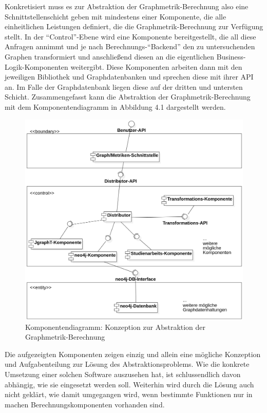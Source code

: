 \documentclass[a4paper,12pt,ngerman,chapterprefix=false,listof=totoc,bibliography=totoc]{scrreprt}
\begin{document}
{{{Konkretisiert muss es zur Abstraktion der Graphmetrik-Berechnung also eine Schnittstellenschicht geben mit mindestens einer Komponente, die alle einheitlichen Leistungen definiert, die die Graphmetrik-Berechnung zur Verfügung stellt. In der "`Control"'-Ebene wird eine Komponente bereitgestellt, die all diese Anfragen annimmt und je nach Berechnungs-"`Backend"' den zu untersuchenden Graphen transformiert und anschließend diesen an die eigentlichen Business-Logik-Komponenten weitergibt. Diese Komponenten arbeiten dann mit den jeweiligen Bibliothek und Graphdatenbanken und sprechen diese mit ihrer API an. Im Falle der Graphdatenbank liegen diese auf der dritten und untersten Schicht. Zusammengefasst kann die Abstraktion der Graphmetrik-Berechnung mit dem Komponentendiagramm in Abbildung 4.1 dargestellt werden.
\begin{figure}[ht!]
	\centering
	\includegraphics[scale=.38]{Abbildungen/UML/component_abstraction.png}
	\caption[Komponentendiagramm: Konzeption zur Abstraktion der Graphmetrik-Berechnung]{Komponentendiagramm: Konzeption zur Abstraktion der Graphmetrik-Berechnung}
\end{figure}
Die aufgezeigten Komponenten zeigen einzig und allein eine mögliche Konzeption und Aufgabenteilung zur Lösung des Abstraktionsproblems. Wie die konkrete Umsetzung einer solchen Software auszusehen hat, ist schlussendlich davon abhängig, wie sie eingesetzt werden soll. Weiterhin wird durch die Lösung auch nicht geklärt, wie damit umgegangen wird, wenn bestimmte Funktionen nur in machen Berechnungskomponenten vorhanden sind.

}}}
\end{document}
